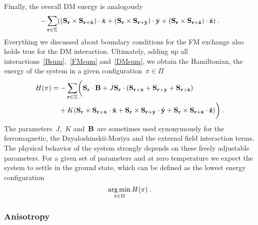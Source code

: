 Finally, the overall DM energy is analogously
%
\begin{equation}\label{DMsum}
  -\sum_{\mathbf{r} \in \Sigma} ((\mathbf{S}_{\mathbf{r}} \times \mathbf{S}_{\mathbf{r} + \hat{\mathbf{x}}}) \cdot \hat{\mathbf{x}} +
    (\mathbf{S}_{\mathbf{r}} \times \mathbf{S}_{\mathbf{r} + \hat{\mathbf{y}}}) \cdot \hat{\mathbf{y}} +
    (\mathbf{S}_{\mathbf{r}} \times \mathbf{S}_{\mathbf{r} + \hat{\mathbf{z}}}) \cdot \hat{\mathbf{z}})\:.
\end{equation}
%
Everything we discussed about boundary conditions for the FM exchange also holds
true for the DM interaction. Ultimately, adding up all
interactions~\eqref{Bsum},~\eqref{FMsum} and~\eqref{DMsum}, we obtain the
Hamiltonian, \ie{} the energy of the system in a given configuration~$\pi \in
\Pi$
%
\begin{align}\label{hamiltonian}
  H(\pi) = &-\sum_{\mathbf{r} \in \Sigma}\biggl(\mathbf{S}_{\mathbf{r}} \cdot \mathbf{B} +
      J \mathbf{S}_{\mathbf{r}} \cdot (\mathbf{S}_{\mathbf{r}+\hat{\mathbf{x}}} + \mathbf{S}_{\mathbf{r}+\hat{\mathbf{y}}} + \mathbf{S}_{\mathbf{r}+\hat{\mathbf{z}}})\nonumber \\
      &+ K (\mathbf{S}_{\mathbf{r}} \times \mathbf{S}_{\mathbf{r}+\hat{\mathbf{x}}} \cdot \hat{\mathbf{x}} +
            \mathbf{S}_{\mathbf{r}} \times \mathbf{S}_{\mathbf{r}+\hat{\mathbf{y}}} \cdot \hat{\mathbf{y}} +
            \mathbf{S}_{\mathbf{r}} \times \mathbf{S}_{\mathbf{r}+\hat{\mathbf{z}}} \cdot \hat{\mathbf{z}})\biggr)\:.
\end{align}
%
The parameters~$J$,~$K$ and~$\mathbf{B}$ are sometimes used synonymously for the
ferromagnetic, the Dzyaloshinskii-Moriya and the external field interaction
terms. The physical behavior of the system strongly depends on these freely
adjustable parameters. For a given set of parameters and at zero temperature we
expect the system to settle in the ground state, which can be defined as the
lowest energy configuration
%
\begin{equation}\label{objective}
  \operatorname*{arg\,min}_{\pi \in \Pi} H(\pi)\:.
\end{equation}
%

\subsubsection{Anisotropy}


